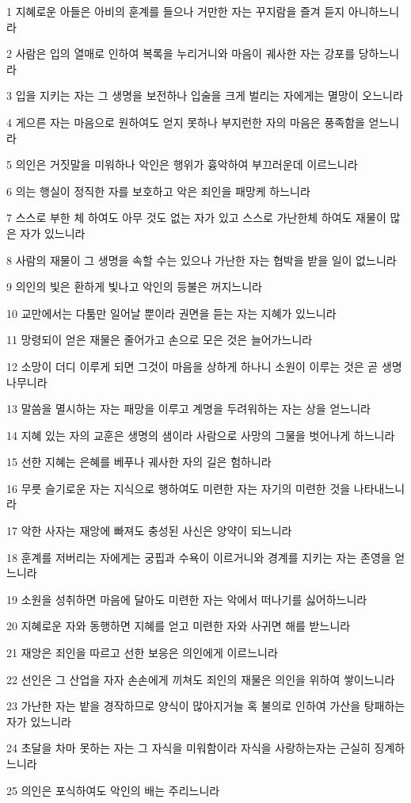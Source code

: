 \par 1 지혜로운 아들은 아비의 훈계를 들으나 거만한 자는 꾸지람을 즐겨 듣지 아니하느니라
\par 2 사람은 입의 열매로 인하여 복록을 누리거니와 마음이 궤사한 자는 강포를 당하느니라
\par 3 입을 지키는 자는 그 생명을 보전하나 입술을 크게 벌리는 자에게는 멸망이 오느니라
\par 4 게으른 자는 마음으로 원하여도 얻지 못하나 부지런한 자의 마음은 풍족함을 얻느니라
\par 5 의인은 거짓말을 미워하나 악인은 행위가 흉악하여 부끄러운데 이르느니라
\par 6 의는 행실이 정직한 자를 보호하고 악은 죄인을 패망케 하느니라
\par 7 스스로 부한 체 하여도 아무 것도 없는 자가 있고 스스로 가난한체 하여도 재물이 많은 자가 있느니라
\par 8 사람의 재물이 그 생명을 속할 수는 있으나 가난한 자는 협박을 받을 일이 없느니라
\par 9 의인의 빛은 환하게 빛나고 악인의 등불은 꺼지느니라
\par 10 교만에서는 다툼만 일어날 뿐이라 권면을 듣는 자는 지혜가 있느니라
\par 11 망령되이 얻은 재물은 줄어가고 손으로 모은 것은 늘어가느니라
\par 12 소망이 더디 이루게 되면 그것이 마음을 상하게 하나니 소원이 이루는 것은 곧 생명나무니라
\par 13 말씀을 멸시하는 자는 패망을 이루고 계명을 두려워하는 자는 상을 얻느니라
\par 14 지혜 있는 자의 교훈은 생명의 샘이라 사람으로 사망의 그물을 벗어나게 하느니라
\par 15 선한 지혜는 은혜를 베푸나 궤사한 자의 길은 험하니라
\par 16 무릇 슬기로운 자는 지식으로 행하여도 미련한 자는 자기의 미련한 것을 나타내느니라
\par 17 악한 사자는 재앙에 빠져도 충성된 사신은 양약이 되느니라
\par 18 훈계를 저버리는 자에게는 궁핍과 수욕이 이르거니와 경계를 지키는 자는 존영을 얻느니라
\par 19 소원을 성취하면 마음에 달아도 미련한 자는 악에서 떠나기를 싫어하느니라
\par 20 지혜로운 자와 동행하면 지혜를 얻고 미련한 자와 사귀면 해를 받느니라
\par 21 재앙은 죄인을 따르고 선한 보응은 의인에게 이르느니라
\par 22 선인은 그 산업을 자자 손손에게 끼쳐도 죄인의 재물은 의인을 위하여 쌓이느니라
\par 23 가난한 자는 밭을 경작하므로 양식이 많아지거늘 혹 불의로 인하여 가산을 탕패하는 자가 있느니라
\par 24 초달을 차마 못하는 자는 그 자식을 미워함이라 자식을 사랑하는자는 근실히 징계하느니라
\par 25 의인은 포식하여도 악인의 배는 주리느니라

